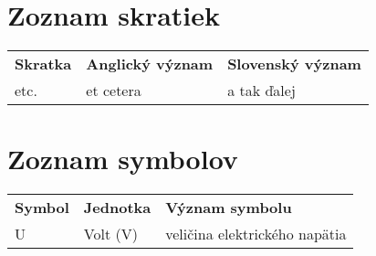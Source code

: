\newpage %
\section*{Zoznam skratiek}

\begin{tabularx}{\textwidth}{
		>{\raggedright\arraybackslash}X
		>{\raggedright\arraybackslash}X
		>{\raggedright\arraybackslash}X }
	\textbf{Skratka} & \textbf{Anglický význam} & \textbf{Slovenský význam} \\
	etc. & et cetera & a tak ďalej
\end{tabularx}

\section*{Zoznam symbolov}

\begin{tabularx}{\textwidth}{
		>{\raggedright\arraybackslash}X
		>{\raggedright\arraybackslash}X
		>{\raggedright\arraybackslash}X }
	\textbf{Symbol} & \textbf{Jednotka} & \textbf{Význam symbolu} \\
	U & Volt (V) & veličina elektrického napätia
\end{tabularx}